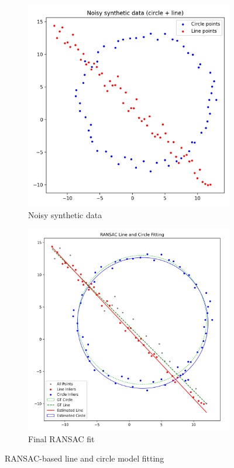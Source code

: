 \documentclass[11pt,a4paper]{article}
\begin{document}
\begin{figure}[H]
\begin{subfigure}{0.23\textwidth}
\includegraphics[width=\linewidth]{figures/q2_noisy_data.png}
\caption{Noisy synthetic data}
\end{subfigure}
\begin{subfigure}{0.23\textwidth}
\includegraphics[width=\linewidth]{figures/q2_ransac_final.png}
\caption{Final RANSAC fit}
\end{subfigure}
\caption{RANSAC-based line and circle model fitting}
\end{figure}
\end{document}
